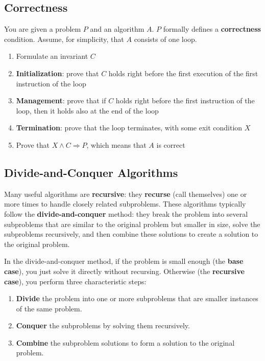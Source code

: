 \subsection{Correctness}

You are given a problem $P$ and an algorithm $A$. 
$P$ formally defines a \textbf{correctness} condition.
Assume, for simplicity, that $A$ consists of one loop.
\begin{enumerate}
    \item Formulate an invariant $C$
    \item \textbf{Initialization}: prove that $C$ holds right before the first execution of the first instruction of the loop
    \item \textbf{Management}: prove that if $C$ holds right before the first instruction of the loop, then it holds also at the end of the loop
    \item \textbf{Termination}: prove that the loop terminates, with some exit condition $X$
    \item Prove that $X\wedge C \Rightarrow P$, which means that $A$ is correct
\end{enumerate}


\subsection{Divide-and-Conquer Algorithms}
\label{sec:divide_and_conquer}

Many useful algorithms are \textbf{recursive}:
they \textbf{recurse} (call themselves) one or more times to handle closely related subproblems.
These algorithms typically follow the \textbf{divide-and-conquer} method:
they break the problem into several subproblems that are similar to the original problem but smaller in size,
solve the subproblems recursively, and then combine these solutions to create a solution to the original problem.

In the divide-and-conquer method, if the problem is small enough (the \textbf{base case}), you just solve it directly without recursing.
Otherwise (the \textbf{recursive case}), you perform three characteristic steps:
\begin{enumerate}
    \item \textbf{Divide} the problem into one or more subproblems that are smaller instances of the same problem.
    \item \textbf{Conquer} the subproblems by solving them recursively.
    \item \textbf{Combine} the subproblem solutions to form a solution to the original problem.
\end{enumerate}



